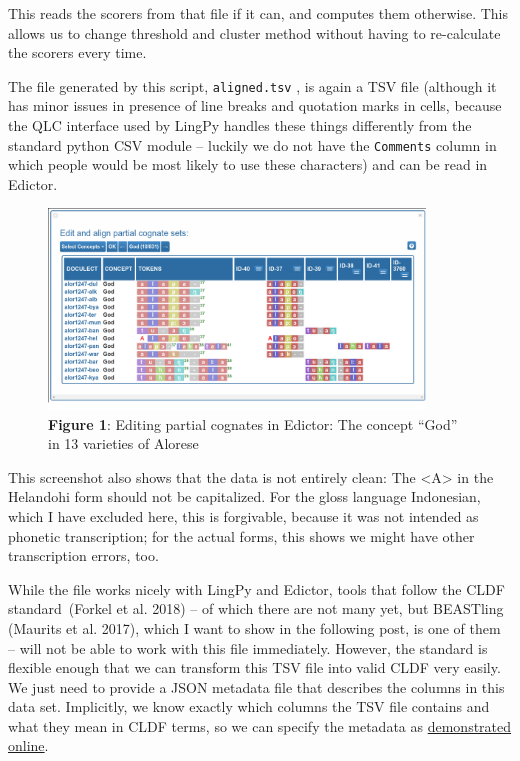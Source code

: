 \documentclass[
  a4paper,
  14pt,
  oneside,
  tablecaptionabove
]{scrbook}
\begin{document}
This reads the scorers from that file if it can, and computes them
otherwise. This allows us to change threshold and cluster method without
having to re-calculate the scorers every time.

The file generated by this script, \lstinline!aligned.tsv! , is again a
TSV file (although it has minor issues in presence of line breaks and
quotation marks in cells, because the QLC interface used by LingPy
handles these things differently from the standard python CSV module --
luckily we do not have the \lstinline!Comments! column in which people
would be most likely to use these characters) and can be read in
Edictor.

\begin{figure}[htb]
\centering
\includegraphics[width=10cm]{images/pcogs.png}
\caption*{\small \textbf{Figure 1}: Editing partial cognates in Edictor: The concept \enquote{God} in 13
varieties of Alorese}
\end{figure}

This screenshot also shows that the data is not entirely clean: The
\textless{}A\textgreater{} in the Helandohi form should not be
capitalized. For the gloss language Indonesian, which I have excluded
here, this is forgivable, because it was not intended as phonetic
transcription; for the actual forms, this shows we might have other
transcription errors, too.

While the file works nicely with LingPy and
Edictor, tools that follow the CLDF standard~(Forkel et al. 2018) -- of
which there are not many yet, but BEASTling (Maurits et al. 2017), which
I want to show in the following post, is one of them -- will not be able
to work with this file immediately. However, the standard is flexible
enough that we can transform this TSV file into valid CLDF very easily.
We just need to provide a JSON metadata file that describes the columns
in this data set. Implicitly, we know exactly which columns the TSV file
contains and what they mean in CLDF terms, so we can specify the
metadata as \href{https://calc.hypotheses.org/849}{demonstrated online}.
\end{document}
